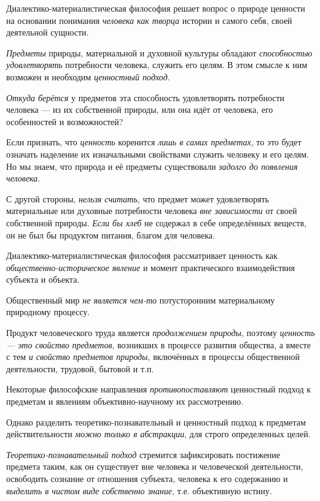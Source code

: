 \documentclass[a4paper,14pt,russian]{extreport}
\begin{document}
Диалектико-материалистическая философия решает вопрос о природе ценности на основании понимания \emph{человека как творца} истории и самого себя, своей деятельной сущности.

\emph{Предметы} природы, материальной и духовной культуры обладают \emph{способностью удовлетворять} потребности человека, служить его целям. В этом смысле к ним возможен и необходим \emph{ценностный подход}.

\emph{Откуда берётся} у предметов эта способность удовлетворять потребности человека --- из их собственной природы, или она идёт от человека, его особенностей и возможностей?

Если признать, что \emph{ценность} коренится \emph{лишь в самих предметах}, то это будет означать наделение их изначальными свойствами служить человеку и его целям. Но мы знаем, что природа и её предметы существовали \emph{задолго до появления человека}.

С другой стороны, \emph{нельзя считать}, что предмет может удовлетворять материальные или духовные потребности человека \emph{вне зависимости} от своей собственной природы. \emph{Если бы хлеб} не содержал в себе определённых веществ, он не был бы продуктом питания, благом для человека.

Диалектико-материалистическая философия рассматривает ценность как \emph{общественно-историческое явление} и момент практического взаимодействия субъекта и объекта.

Общественный мир \emph{не является чем-то} потусторонним материальному природному процессу.

Продукт человеческого труда является \emph{продолжением природы}, поэтому \emph{ценность --- это свойство} \emph{предметов}, возникших в процессе развития общества, а вместе с тем \emph{и свойство предметов природы}, включённых в процессы общественной деятельности, трудовой, бытовой и т.п.

Некоторые философские направления \emph{противопоставляют} ценностный подход к предметам и явлениям объективно-научному их рассмотрению.

Однако разделить теоретико-познавательный и ценностный подход к предметам действительности \emph{можно только в абстракции}, для строго определенных целей.

\emph{Теоретико-познавательный подход} стремится зафиксировать постижение предмета таким, как он существует вне человека и человеческой деятельности, освободить сознание от отношения субъекта, человека к его содержанию и \emph{выделить в чистом виде собственно знание}, т.е. объективную истину.
\end{document}
